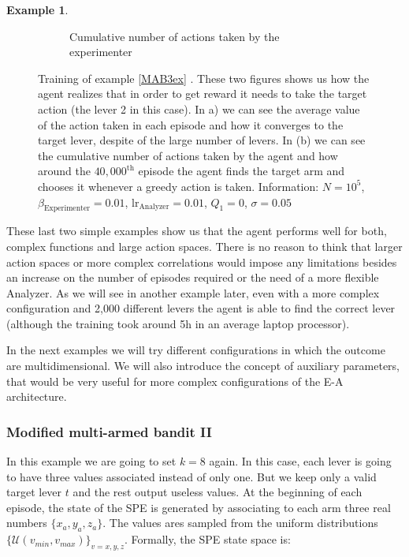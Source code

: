 \documentclass[11pt,a4paper,twoside]{report}
\newcommand{\+}{\textnormal{+} }
\theoremstyle{definition}
\newtheorem{myex}[mythm]{Example}
\numberwithin{equation}{chapter}
\begin{document}
\begin{myex}
\begin{figure}[]
\begin{subfigure}{.5\textwidth}
        \caption{Cumulative number of actions taken by the experimenter}
        \label{fig:actionsMAB3}
      \end{subfigure}
      \caption{Training of example \ref{MAB3ex} . These two figures shows us how
      the agent realizes that in order to get reward it needs to take the target
      action (the lever 2 in this case). In a) we can see the average value of
      the action taken in each episode and how it converges to the target lever,
      despite of the large number of levers. In (b) we can see the cumulative
      number of actions taken by the agent and how around the $40,000^\text{th}$
      episode the agent finds the target arm and chooses it whenever a greedy
      action is taken. Information: $N=10^5$, $\beta_\text{Experimenter}=0.01$,
      $\text{lr}_\text{Analyzer}=0.01$, $Q_1=0$, $\sigma=0.05$}
    \end{figure}
  \end{myex}

  These last two simple examples show us that the agent performs well for both,
  complex functions and large action spaces. There is no reason to think that
  larger action spaces or more complex correlations would impose any limitations
  besides an increase on the number of episodes required or the need of a more
  flexible Analyzer. As we will see in another example later, even with a more
  complex configuration and 2,000 different levers the agent is able to find the
  correct lever (although the training took around 5h in an average laptop
  processor).

  \par In the next examples we will try different configurations in which the
  outcome are multidimensional. We will also introduce the concept of auxiliary
  parameters, that would be very useful for more complex configurations of the
  E-A architecture.

  \subsubsection{Modified multi-armed bandit II}
    In this example we are going to set $k=8$ again. In this case, each
    lever is going to have three values associated instead of only one. But 
    we keep only a valid target lever $t$ and the rest output useless
    values. At the beginning of each episode, the
    state of the SPE is generated by associating to each arm three real numbers
     $\{x_a,y_a,z_a\}$. The values ares sampled from the uniform distributions
    $\{\mathcal{U}(v_{min},v_{max})\}_{v=x,y,z}$. Formally, the SPE state space 
    is:
    
\end{document}
